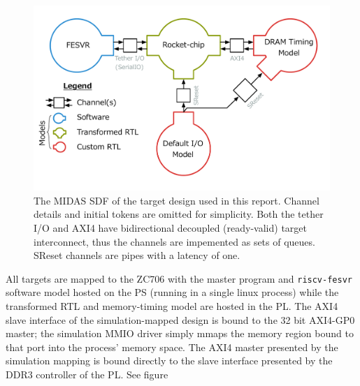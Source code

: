 \begin{figure}
	\centering
	\includegraphics[width=16cm]{figures/masters-target.pdf}
    \caption{The MIDAS SDF of the target design used in this report. Channel
    details and initial tokens are omitted for simplicity. Both the tether I/O
    and AXI4 have bidirectional decoupled (ready-valid) target interconnect,
    thus the channels are impemented as sets of queues. SReset channels are pipes with
    a latency of one.}
	\label{fig:default-target}
\end{figure}

All targets are mapped to the ZC706 with the master program and
\texttt{riscv-fesvr} software model hosted on the PS (running in a single linux
process) while the transformed RTL and memory-timing model are hosted in the
PL. The AXI4 slave interface of the simulation-mapped design is bound to the 32
bit AXI4-GP0 master; the simulation MMIO driver simply mmaps the memory region
bound to that port into the process' memory space.  The AXI4 master presented
by the simulation mapping is bound directly to the slave interface presented by
the DDR3 controller of the PL. See figure 
